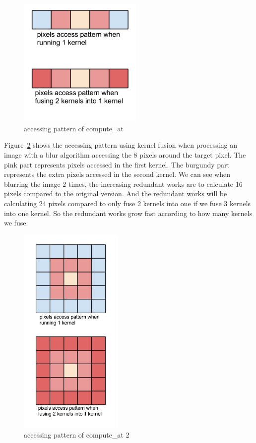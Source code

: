 \documentclass{sigplanconf}
\begin{document}
\begin{figure}[hbtp]
\centering
\includegraphics[width=6cm]{img/figure3.png}
\caption{accessing pattern of compute\_at}
\label{fig:my_label4}
\end{figure}
	
	Figure~\ref{fig:my_label5} shows the accessing pattern using kernel fusion when processing an image with a blur algorithm accessing the 8 pixels around the target pixel. The pink part represents pixels accessed in the first kernel. The burgundy part represents the extra pixels accessed in the second kernel. We can see when blurring the image 2 times, the increasing redundant works are to calculate 16 pixels compared to the original version. And the redundant works will be calculating 24 pixels compared to only fuse 2 kernels into one if we fuse 3 kernels into one kernel. So the redundant works grow fast according to how many kernels we fuse.

\begin{figure}[hbtp]
\centering
\includegraphics[width=5cm]{img/figure4.png}
\caption{accessing pattern of compute\_at 2}
\label{fig:my_label5}
\end{figure}
\end{document}
